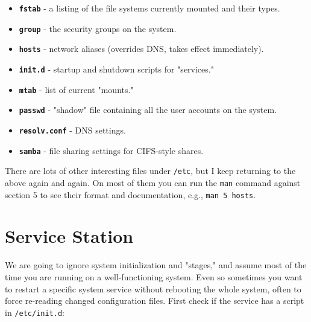 \documentclass[10pt,american,]{book}
\numberwithin{figure}{chapter}
\begin{document}
\begin{itemize}
\item
  \textbf{\texttt{fstab}}
  - a listing of the file systems currently mounted and their types.
\item
  \textbf{\texttt{group}}
  - the security groups on the system.
\item
  \textbf{\texttt{hosts}}
  - network aliases (overrides DNS, takes effect immediately).
\item
  \textbf{\texttt{init.d}}
  - startup and shutdown scripts for "services."
\item
  \textbf{\texttt{mtab}}
  - list of current "mounts."
\item
  \textbf{\texttt{passwd}}
  - "shadow" file containing all the user accounts on the system.
\item
  \textbf{\texttt{resolv.conf}}
  - DNS settings.
\item
  \textbf{\texttt{samba}}
  - file sharing settings for CIFS-style shares.
\end{itemize}

There are lots of other interesting files under \texttt{/etc}, but I
keep returning to the above again and again. On most of them you can run
the \texttt{man} command against section 5 to see their format and
documentation, e.g., \texttt{man\ 5\ hosts}.

\section*{Service Station}\label{service-station}

We are going to ignore system initialization and "stages," and assume
most of the time you are running on a well-functioning system. Even so
sometimes you want to restart a specific system service without
rebooting the whole system, often to force re-reading changed
configuration files. First check if the service has a script in
\texttt{/etc/init.d}:
\end{document}
